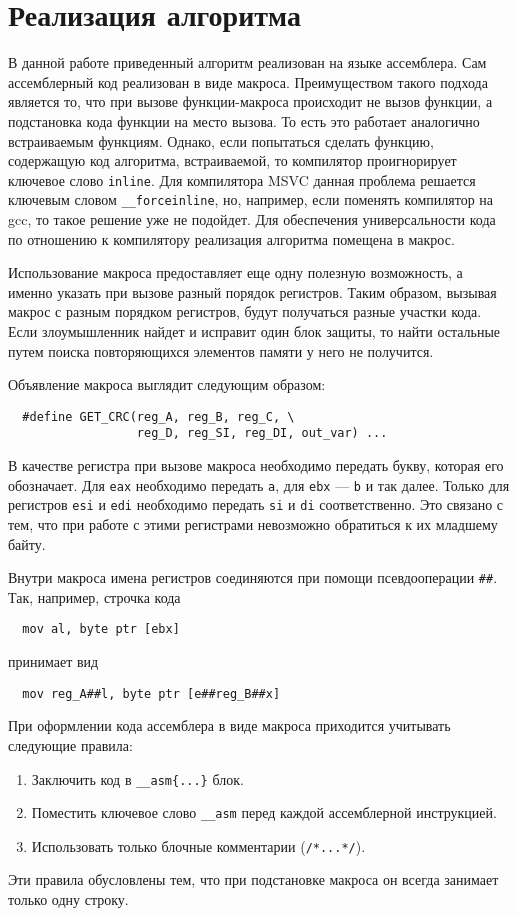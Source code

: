 
\section{Реализация алгоритма}

В данной работе приведенный алгоритм реализован на языке ассемблера. Сам
ассемблерный код реализован в виде макроса. Преимуществом такого подхода
является то, что при вызове функции-макроса происходит не вызов функции, а
подстановка кода функции на место вызова. То есть это работает аналогично
встраиваемым функциям. Однако, если попытаться сделать функцию, содержащую код
алгоритма, встраиваемой, то компилятор проигнорирует ключевое слово
\verb!inline!. Для компилятора MSVC данная проблема решается ключевым словом
\verb!__forceinline!, но, например, если поменять компилятор на gcc, то такое
решение уже не подойдет.  Для обеспечения универсальности кода по отношению к
компилятору реализация алгоритма помещена в макрос.

Использование макроса предоставляет еще одну полезную возможность, а именно
указать при вызове разный порядок регистров. Таким образом, вызывая
макрос с разным порядком регистров, будут получаться разные участки кода. Если
злоумышленник найдет и исправит один блок защиты, то найти остальные путем
поиска повторяющихся элементов памяти у него не получится.

Объявление макроса выглядит следующим образом:
\begin{verbatim}
  #define GET_CRC(reg_A, reg_B, reg_C, \
                  reg_D, reg_SI, reg_DI, out_var) ...
\end{verbatim}
В качестве регистра при вызове макроса необходимо передать букву, которая его
обозначает. Для \verb!eax! необходимо передать \verb!a!, для \verb!ebx! ---
\verb!b! и так далее. Только для регистров \verb!esi! и \verb!edi! необходимо
передать \verb!si! и \verb!di! соответственно. Это связано с тем, что при работе
с этими регистрами невозможно обратиться к их младшему байту.

Внутри макроса имена регистров соединяются при помощи псевдооперации \verb!##!.
Так, например, строчка кода
\begin{verbatim}
  mov al, byte ptr [ebx]
\end{verbatim}
принимает вид
\begin{verbatim}
  mov reg_A##l, byte ptr [e##reg_B##x]
\end{verbatim}

При оформлении кода ассемблера в виде макроса приходится учитывать следующие
правила:
\begin{enumerate}
  \item Заключить код в \verb!__asm{...}! блок.
  \item Поместить ключевое слово \verb!__asm! перед каждой ассемблерной
    инструкцией.
  \item Использовать только блочные комментарии (\verb!/*...*/!).
\end{enumerate}
Эти правила обусловлены тем, что при подстановке макроса он всегда занимает
только одну строку.

